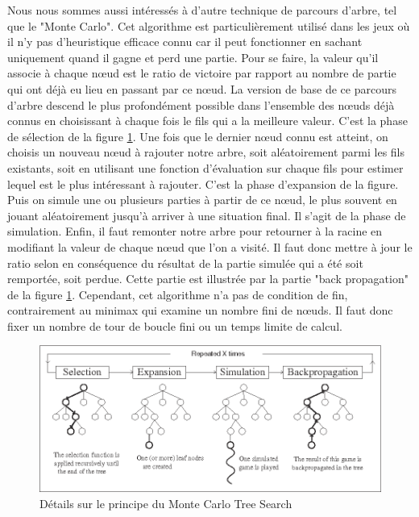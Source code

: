 \documentclass[12pt]{article}
\begin{document}
Nous nous sommes aussi intéressés à d'autre technique de parcours d'arbre, tel que le "Monte Carlo\cite{MonteCarlo}". Cet algorithme est particulièrement utilisé dans les jeux où il n'y pas d'heuristique efficace connu car il peut fonctionner en sachant uniquement quand il gagne et perd une partie. Pour se faire, la valeur qu'il associe à chaque nœud est le ratio de victoire par rapport au nombre de partie qui ont déjà eu lieu en passant par ce nœud. La version de base de ce parcours d'arbre descend le plus profondément possible dans l'ensemble des nœuds déjà connus en choisissant à chaque fois le fils qui a la meilleure valeur. C'est la phase de sélection de la figure \ref{figMT}.
Une fois que le dernier nœud connu est atteint, on choisis un nouveau nœud à rajouter notre arbre, soit aléatoirement parmi les fils existants, soit en utilisant une fonction d'évaluation sur chaque fils pour estimer lequel est le plus intéressant à rajouter. C'est la phase d’expansion de la figure. Puis on simule une ou plusieurs parties à partir de ce nœud, le plus souvent en jouant aléatoirement jusqu’à arriver à une situation final. Il s'agit de la phase de simulation. Enfin, il faut remonter notre arbre pour retourner à la racine en modifiant la valeur de chaque nœud que l'on a visité. Il faut donc mettre à jour le ratio selon en conséquence du résultat de la partie simulée qui a été soit remportée, soit perdue. Cette partie est illustrée par la partie "back propagation" de la figure \ref{figMT}. Cependant, cet algorithme n'a pas de condition de fin, contrairement au minimax qui examine un nombre fini de nœuds. Il faut donc fixer un nombre de tour de boucle fini ou un temps limite de calcul.

\begin{figure}[H]
\includegraphics[scale=0.4]{MT.png}
\centering
\caption{Détails sur le principe du Monte Carlo Tree Search \cite{ChaslotMT}}
\label{figMT}
\end{figure}
\end{document}
